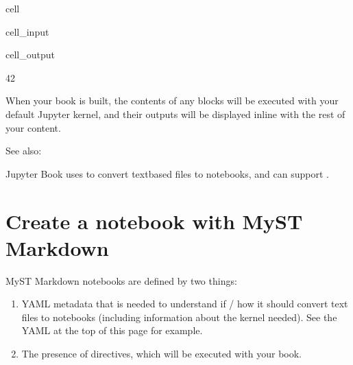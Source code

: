 \documentclass[letterpaper,10pt,english]{jupyterBook}
\begin{document}
\begin{sphinxuseclass}{cell}\begin{sphinxVerbatimInput}

\begin{sphinxuseclass}{cell_input}
\begin{sphinxVerbatim}[commandchars=\\\{\}]
  
\end{sphinxVerbatim}

\end{sphinxuseclass}\end{sphinxVerbatimInput}
\begin{sphinxVerbatimOutput}

\begin{sphinxuseclass}{cell_output}
\begin{sphinxVerbatim}[commandchars=\\\{\}]
42
\end{sphinxVerbatim}

\end{sphinxuseclass}\end{sphinxVerbatimOutput}

\end{sphinxuseclass}
\sphinxAtStartPar
When your book is built, the contents of any  blocks will be
executed with your default Jupyter kernel, and their outputs will be displayed
in\sphinxhyphen{}line with the rest of your content.


\begin{sphinxseealso}{See also:}

\sphinxAtStartPar
Jupyter Book uses  to convert text\sphinxhyphen{}based files to notebooks, and can support .


\end{sphinxseealso}



\section{Create a notebook with MyST Markdown}
\label{\detokenize{markdown-notebooks:create-a-notebook-with-myst-markdown}}
\sphinxAtStartPar
MyST Markdown notebooks are defined by two things:
\begin{enumerate}
%
\item {} 
\sphinxAtStartPar
YAML metadata that is needed to understand if / how it should convert text files to notebooks (including information about the kernel needed).
See the YAML at the top of this page for example.

\item {} 
\sphinxAtStartPar
The presence of  directives, which will be executed with your book.

\end{enumerate}
\end{document}
